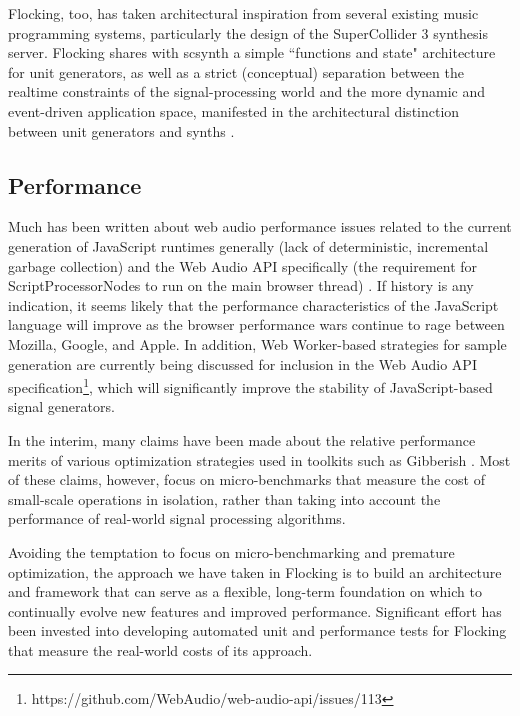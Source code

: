 \documentclass{article}
\begin{document}
Flocking, too, has taken architectural inspiration from several existing music programming systems, particularly the design of the SuperCollider 3 synthesis server. Flocking shares with scsynth a simple ``functions and state" architecture for unit generators, as well as a strict (conceptual) separation between the realtime constraints of the signal-processing world and the more dynamic and event-driven application space, manifested in the architectural distinction between unit generators and synths \cite[pp. 64]{mccartney2002rethinking}.

\subsection{Performance}

Much has been written about web audio performance issues related to the current generation of JavaScript runtimes generally (lack of deterministic, incremental garbage collection) and the Web Audio API specifically (the requirement for ScriptProcessorNodes to run on the main browser thread) \cite{DBLP:journals/comj/WyseS13,roberts_web_2013}. If history is any indication, it seems likely that the performance characteristics of the JavaScript language will improve as the browser performance wars continue to rage between Mozilla, Google, and Apple. In addition, Web Worker-based strategies for sample generation are currently being discussed for inclusion in the Web Audio API specification\footnote{https://github.com/WebAudio/web-audio-api/issues/113}, which will significantly improve the stability of JavaScript-based signal generators.

In the interim, many claims have been made about the relative performance merits of various optimization strategies used in toolkits such as Gibberish \cite{roberts_web_2013}. Most of these claims, however, focus on micro-benchmarks that measure the cost of small-scale operations in isolation, rather than taking into account the performance of real-world signal processing algorithms.

Avoiding the temptation to focus on micro-benchmarking and premature optimization, the approach we have taken in Flocking is to build an architecture and framework that can serve as a flexible, long-term foundation on which to continually evolve new features and improved performance. Significant effort has been invested into developing automated unit and performance tests for Flocking that measure the real-world costs of its approach.
\end{document}
